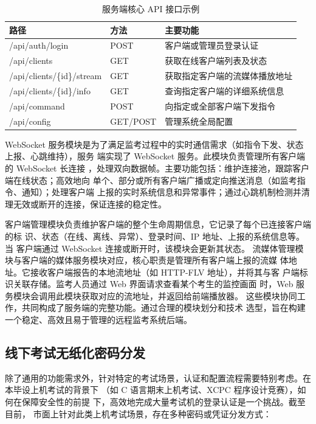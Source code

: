 \begin{table}[htbp]
  \centering
  \caption{服务端核心 API 接口示例}
  \label{tab:server_api}
  \begin{tabular}{lll}
    \toprule
    \textbf{路径} & \textbf{方法} & \textbf{主要功能} \\
    \midrule
    /api/auth/login & POST & 客户端或管理员登录认证 \\
    /api/clients & GET & 获取在线客户端列表及状态 \\
    /api/clients/\{id\}/stream & GET & 获取指定客户端的流媒体播放地址 \\
    /api/clients/\{id\}/info & GET & 查询指定客户端的详细系统信息 \\
    /api/command & POST & 向指定或全部客户端下发指令 \\
    /api/config & GET/POST & 管理系统全局配置 \\
    \bottomrule
  \end{tabular}
\end{table}
    
WebSocket 服务模块是为了满足监考过程中的实时通信需求（如指令下发、状态上报、心跳维持），服务
端实现了 WebSocket 服务。此模块负责管理所有客户端的 WebSocket 长连接
，处理双向数据帧。主要功能包括：维护连接池，跟踪客户端在线状态；高效地向
单个、部分或所有客户端广播或定向推送消息（如监考指令、通知）；处理客户端
上报的实时系统信息和异常事件；通过心跳机制检测并清理无效或断开的连接，保证连接的稳定性。

客户端管理模块负责维护客户端的整个生命周期信息，它记录了每个已连接客户端的标
识、状态（在线、离线、异常）、登录时间、IP 地址、上报的系统信息等。当
客户端通过 WebSocket 连接或断开时，该模块会更新其状态。
流媒体管理模块与客户端的媒体服务模块对应，核心职责是管理所有客户端上报的流媒
体地址。它接收客户端报告的本地流地址（如 HTTP-FLV 地址），并将其与客
户端标识关联存储。监考人员通过 Web 界面请求查看某个考生的监控画面
时，Web 服务模块会调用此模块获取对应的流地址，并返回给前端播放器。
这些模块协同工作，共同构成了服务端的完整功能。通过合理的模块划分和技术
选型，旨在构建一个稳定、高效且易于管理的远程监考系统后端。


\subsection{线下考试无纸化密码分发}

除了通用的功能需求外，针对特定的考试场景，认证和配置流程需要特别考虑。在本毕设上机考试的背景下
（如 C 语言期末上机考试、XCPC 程序设计竞赛），如何在保障安全性的前提
下，高效地完成大量考试机的登录认证是一个挑战。截至目前，
市面上针对此类上机考试场景，存在多种密码或凭证分发方式：

